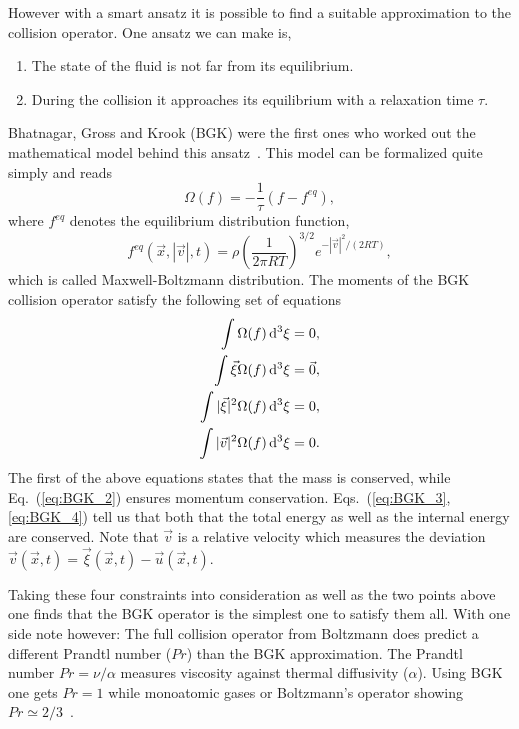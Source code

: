 However with a smart ansatz it is possible to find a suitable approximation to the collision operator.
One ansatz we can make is,
\begin{enumerate}
    \item The state of the fluid is not far from its equilibrium.
    \item During the collision it approaches its equilibrium with a relaxation time $\tau$.
\end{enumerate}
Bhatnagar, Gross and Krook (BGK) were the first ones who worked out the mathematical model behind this ansatz~\cite{bhatnagarModelCollisionProcesses1954}.
This model can be formalized quite simply and reads
\begin{equation}\label{eq:operator_bgk}
    \Omega(f) = -\frac{1}{\tau}(f - f^{eq}),
\end{equation}
where $f^{eq}$ denotes the equilibrium distribution function,
\begin{equation}\label{eq:boltzmann_eq_dist}
    f^{eq}(\vec{x}, |\vec{v}|, t) = \rho\left(\frac{1}{2\pi R T}\right)^{3/2} e^{-|\vec{v}|^2/(2RT)},
\end{equation}
which is called Maxwell-Boltzmann distribution.
The moments of the BGK collision operator satisfy the following set of equations
\begin{align}
    \int \Omega(f) \mathop{}\!\mathrm{d}^3\xi = 0, \label{eq:BGK_1}\\
    \int \vec{\xi}\Omega(f) \mathop{}\!\mathrm{d}^3\xi = \vec{0}, \label{eq:BGK_2}\\
    \int |\vec{\xi}|^2\Omega(f) \mathop{}\!\mathrm{d}^3\xi = 0, \label{eq:BGK_3}\\
    \int |\vec{v}|^2\Omega(f) \mathop{}\!\mathrm{d}^3\xi = 0. \label{eq:BGK_4}
\end{align}
The first of the above equations states that the mass is conserved, while Eq.~(\ref{eq:BGK_2}) ensures momentum conservation.
Eqs.~(\ref{eq:BGK_3}, \ref{eq:BGK_4}) tell us that both that the total energy as well as the internal energy are conserved.
Note that $\vec{v}$ is a relative velocity which measures the deviation $\vec{v}(\vec{x}, t) = \vec{\xi}(\vec{x}, t) - \vec{u}(\vec{x}, t)$.

Taking these four constraints into consideration as well as the two points above one finds that the BGK operator is the simplest one to satisfy them all.
With one side note however: The full collision operator from Boltzmann does predict a different Prandtl number ($Pr$) than the BGK approximation.
The Prandtl number $Pr = \nu/\alpha$ measures viscosity against thermal diffusivity ($\alpha$). 
Using BGK one gets $Pr=1$ while monoatomic gases or Boltzmann's operator showing $Pr\simeq 2/3$~\cite{cercignaniBoltzmannEquation1988, krugerLatticeBoltzmannMethod2017}.


